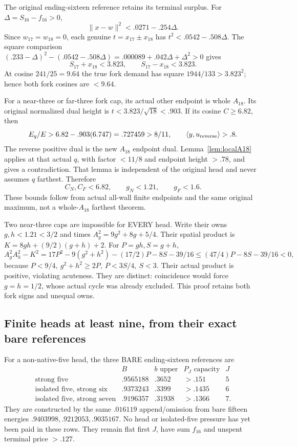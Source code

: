\documentclass[11pt]{article}
\theoremstyle{definition}
\theoremstyle{remark}
\newcommand{\ip}[2]{\langle #1,#2\rangle}
\newcommand{\norm}[1]{\lVert #1\rVert}
\begin{document}
The original ending-sixteen reference retains its terminal surplus.
For \(\Delta=S_{16}-f_{16}>0\),
\[
 \norm{x-w}^2<.0271-.254\Delta .
\]
Since \(w_{17}=w_{18}=0\), each genuine
\(t=x_{17}\pm x_{18}\) has \(t^2<.0542-.508\Delta\).
The square comparison
\((.233-\Delta)^2-(.0542-.508\Delta)
=.000089+.042\Delta+\Delta^2>0\)
gives
\[
 S_{17}+x_{18}<3.823,\qquad S_{17}-x_{18}<3.823.
\]
At cosine \(241/25=9.64\) the true fork demand has square
\(1944/133>3.823^2\); hence both fork cosines are \(<9.64\).

For a near-three or far-three fork cap, its actual other endpoint is
whole \(A_{18}\). Its original normalized dual height is
\(t<3.823/\sqrt{18}<.903\).
If its cosine \(C\geq6.82\), then
\[
 E_q/E>6.82-.903(6.747)=.727459>8/11,
 \qquad \ip y{u_{\rm reverse}}>.8 .
\]
The reverse positive dual is the new \(A_{18}\) endpoint dual.
Lemma~\ref{lem:localA18} applies at that actual \(q\), with factor
\(<11/8\) and endpoint height \(>.78\), and gives a contradiction.
That lemma is independent of the original head and never assumes
\(q\) farthest. Therefore
\[
 C_N,C_F<6.82,\qquad g_N<1.21,\qquad g_F<1.6 .
\]
These bounds follow from actual all-wall finite endpoints and
the same original maximum, not a whole-\(A_{18}\) farthest theorem.

Two near-three caps are impossible for EVERY head.
Write their owns \(g,h<1.21<3/2\) and times
\(A_g^2=9g^2+8g+5/4\).
Their spatial product is
\(K=8gh+(9/2)(g+h)+2\).
For \(P=gh,S=g+h\),
\[
 A_g^2A_h^2-K^2
 =17P^2-9(g^2+h^2)-(17/2)P-8S-39/16
 \leq(47/4)P-8S-39/16<0 ,
\]
because \(P<9/4,\ g^2+h^2\geq2P,\ P<3S/4,\ S<3\).
Their actual product is positive, violating acuteness.
They are distinct: coincidence would force \(g=h=1/2\),
whose actual cycle was already excluded.
This proof retains both fork signs and unequal owns.

\subsection{Finite heads at least nine, from their exact bare references}
\label{app:D18finiteheadslarge}
For a non-native-five head, the three BARE ending-sixteen references
are
\[
\begin{array}{c|c|c|c|c}
 &B&b\text{ upper}&P_J\text{ capacity}&J\\ \hline
\text{strong five}&.9565188&.3652&>.151&5\\
\text{isolated five, strong six}&.9373243&.3399&>.1435&6\\
\text{isolated five, strong seven}&.9196357&.31938&>.1366&7 .
\end{array}
\]
They are constructed by the same \(.016119\) append/omission
from bare fifteen energies
\(.9403998,\allowbreak .9212053,\allowbreak .9035167\).
No head or isolated-five pressure has yet been paid in these rows.
They remain flat first \(J\), have sum \(f_{16}\) and unspent
terminal price \(>.127\).
\end{document}
